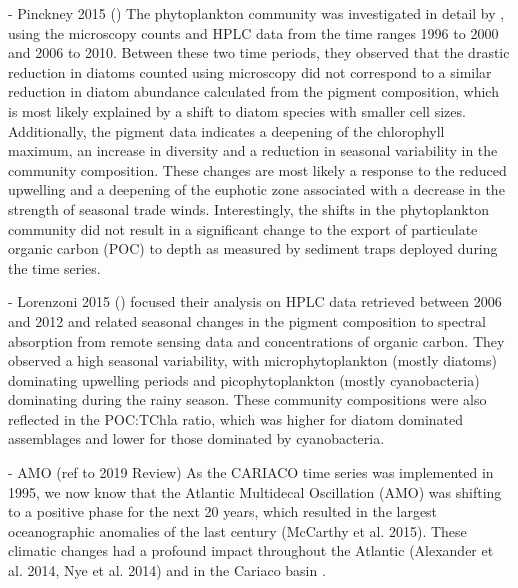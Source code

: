 \documentclass[draft]{agujournal2019}
\begin{document}
    - Pinckney 2015 ()
    The phytoplankton community was investigated in detail by , using the microscopy counts and HPLC data from the time ranges 1996 to 2000 and 2006 to 2010. Between these two time periods, they observed that the drastic reduction in diatoms counted using microscopy did not correspond to a similar reduction in diatom abundance calculated from the pigment composition, which is most likely explained by a shift to diatom species with smaller cell sizes. Additionally, the pigment data indicates a deepening of the chlorophyll maximum, an increase in diversity and a reduction in seasonal variability in the community composition. These changes are most likely a response to the reduced upwelling  and a deepening of the euphotic zone associated with a decrease in the strength of seasonal trade winds. Interestingly, the shifts in the phytoplankton community did not result in a significant change to the export of particulate organic carbon (POC) to depth as measured by sediment traps deployed during the time series. 

    - Lorenzoni 2015 ()
     focused their analysis on HPLC data retrieved between 2006 and 2012 and related seasonal changes in the pigment composition to spectral absorption from remote sensing data and concentrations of organic carbon. They observed a high seasonal variability, with microphytoplankton (mostly diatoms) dominating upwelling periods and picophytoplankton (mostly cyanobacteria) dominating during the rainy season. These community compositions were also reflected in the POC:TChla ratio, which was higher for diatom dominated assemblages and lower for those dominated by cyanobacteria. 
    
    - AMO (ref to 2019 Review)
    As the CARIACO time series was implemented in 1995, we now know that the Atlantic Multidecal Oscillation (AMO) was shifting to a positive phase for the next 20 years, which resulted in the largest oceanographic anomalies of the last century (McCarthy et al. 2015). These climatic changes had a profound impact throughout the Atlantic (Alexander et al. 2014, Nye et al. 2014) and in the Cariaco basin \cite{taylor_ecosystem_2012,pinckney_phytoplankton_2015}.
\end{document}
